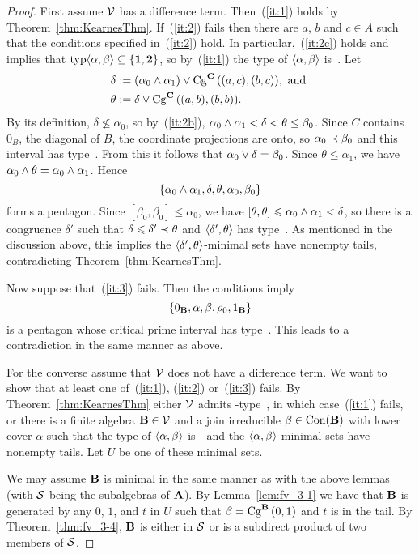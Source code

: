 \begin{proof}
First assume $\sV$ has a difference term.
Then~(\ref{it:1}) holds by Theorem~\ref{thm:KearnesThm}.
If~(\ref{it:2}) fails then there are $a$, $b$ and $c\in A$ such
that the conditions specified in~(\ref{it:2}) hold.
In particular,~(\ref{it:2c}) holds and implies that
$\typ\<\alpha, \beta\> \subseteq \{\utyp, \atyp\}$,
so by~(\ref{it:1}) the type of $\<\alpha, \beta\>$ is~\atyp.
Let
\begin{align*}
\delta &:= (\alpha_0 \meet \alpha_1) \join \Cga {(a,c)} {(b,c)} C,
            \text{ and }\\
\theta &:= \delta \join \Cga {(a,b)}{(b,b)} C.
\end{align*}
By its definition, $\delta \nleq \alpha_0$,
so by~(\ref{it:2b}), $\alpha_0\meet\alpha_1 < \delta < \theta \le \beta_0$.
Since $C$ contains $0_B$, the diagonal of $B$, the coordinate
projections are onto, so $\alpha_0 \cov \beta_0$ and this interval
has type~\atyp.
From this it follows that $\alpha_0 \join \delta = \beta_0$.
Since $\theta \le \alpha_1$, we have $\alpha_0 \meet \theta = \alpha_0\meet\alpha_1$.
Hence
\[
\{\alpha_0\meet\alpha_1, \delta, \theta, \alpha_0, \beta_0 \}
\]
forms a pentagon.
Since $[\beta_0,\beta_0] \leq \alpha_0$, we have
$[\theta,\theta] \leq \alpha_0\meet\alpha_1 < \delta$,
so there is a congruence $\delta'$ such that
$\delta\leq \delta' \cov \theta$ and $\<\delta', \theta\>$
has type~\atyp.
As mentioned in the discussion above, this implies the
$\la \delta',\theta\ra$-minimal sets have nonempty tails, contradicting
Theorem~\ref{thm:KearnesThm}.

Now suppose that~(\ref{it:3}) fails. Then the conditions imply
\[
\{0_{\alg B}, \alpha, \beta, \rho_0, 1_{\alg B} \}
\]
is a pentagon whose critical prime interval has type~\atyp. This
leads to a contradiction in the same manner as above.

For the converse assume that $\sV$ does not have a difference
term.
We want to show that at least one of~(\ref{it:1}), (\ref{it:2}) or~(\ref{it:3}) fails.
By Theorem~\ref{thm:KearnesThm} either $\sV$ admits \tct-type~\utyp, in which case~(\ref{it:1}) fails, or there is a finite
algebra $\alg B \in \sV$ and a join irreducible
$\beta \in \op{Con}(\alg B)$ with lower cover
$\alpha$ such that the type of $\<\alpha, \beta\>$ is~\atyp\
and the $\la\alpha,\beta\ra$-minimal sets have
nonempty tails. Let $U$ be one of these minimal sets.


We may assume $\alg B$ is minimal in the same manner as with the
above lemmas (with $\sS$ being the subalgebras of $\alg A$).
By Lemma~\ref{lem:fv_3-1}
we have that $\alg B$ is generated by any $0$, $1$, and $t$ in
$U$ such
that $\beta = \Cga 01{B}$ and $t$ is in the tail. By
Theorem~\ref{thm:fv_3-4}, $\alg B$ is either
in $\sS$ or is a subdirect product of two members of $\sS$.


\end{proof}
